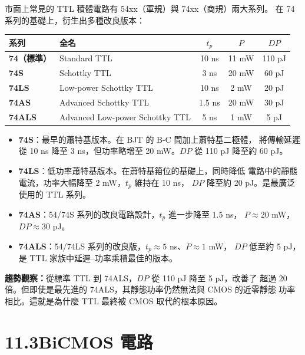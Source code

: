 \documentclass[12pt]{article}
\begin{document}
市面上常見的 TTL 積體電路有 54xx（軍規）與 74xx（商規）兩大系列。
在 74 系列的基礎上，衍生出多種改良版本：

\begin{center}
\renewcommand{\arraystretch}{1.3}
\begin{tabular}{>{\bfseries}l l c c c}
\toprule
\textbf{系列} & \textbf{全名} & $t_p$ & $P$ & $DP$ \\
\midrule
74（標準） & Standard TTL & 10 ns & 11 mW & 110 pJ \\
74S & Schottky TTL & 3 ns & 20 mW & 60 pJ \\
74LS & Low-power Schottky TTL & 10 ns & 2 mW & 20 pJ \\
74AS & Advanced Schottky TTL & 1.5 ns & 20 mW & 30 pJ \\
74ALS & Advanced Low-power Schottky TTL & 5 ns & 1 mW & 5 pJ \\
\bottomrule
\end{tabular}
\end{center}

\begin{keybox}
\begin{itemize}[leftmargin=2em,itemsep=3pt]
\item \textbf{74S}：最早的蕭特基版本。在 BJT 的 B-C 間加上蕭特基二極體，
  將傳輸延遲從 10 ns 降至 3 ns，但功率略增至 20 mW。$DP$ 從 110 pJ
  降至約 60 pJ。
\item \textbf{74LS}：低功率蕭特基版本。在蕭特基箝位的基礎上，同時降低
  電路中的靜態電流，功率大幅降至 2 mW，$t_p$ 維持在 10 ns，
  $DP$ 降至約 20 pJ。是最廣泛使用的 TTL 系列。
\item \textbf{74AS}：54/74S 系列的改良電路設計，$t_p$ 進一步降至 1.5 ns，
  $P \approx 20$ mW，$DP \approx 30$ pJ。
\item \textbf{74ALS}：54/74LS 系列的改良版，$t_p \approx 5$ ns、$P \approx 1$ mW，
  $DP$ 低至約 5 pJ，是 TTL 家族中延遲--功率乘積最佳的版本。
\end{itemize}
\end{keybox}

\noindent
\textbf{趨勢觀察：}從標準 TTL 到 74ALS，$DP$ 從 110 pJ 降至 5 pJ，改善了
超過 20 倍。但即使是最先進的 74ALS，其靜態功率仍然無法與 CMOS 的近零靜態
功率相比。這就是為什麼 TTL 最終被 CMOS 取代的根本原因。

\section*{11.3\quad BiCMOS 電路}
\end{document}
